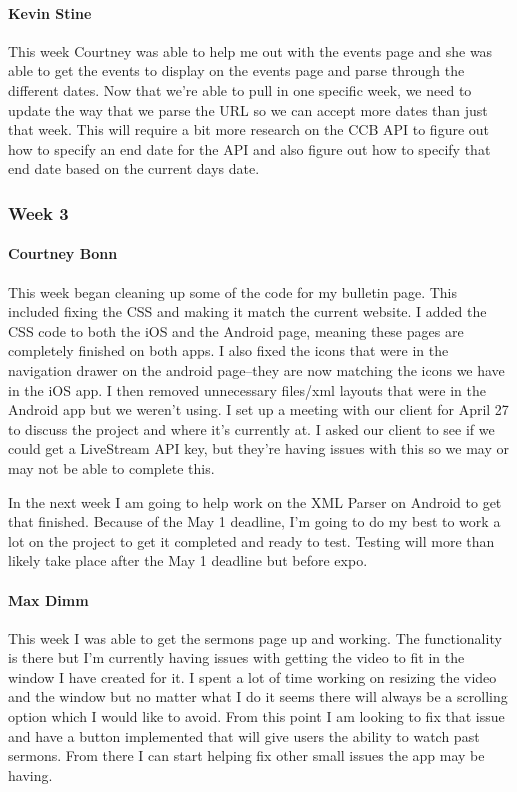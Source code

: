 			\paragraph{Kevin Stine}
			This week Courtney was able to help me out with the events page and she was able to get the events to display on the events page and parse through the different dates. Now that we're able to pull in one specific week, we need to update the way that we parse the URL so we can accept more dates than just that week. This will require a bit more research on the CCB API to figure out how to specify an end date for the API and also figure out how to specify that end date based on the current days date.

		\subsubsection{Week 3}

			\paragraph{Courtney Bonn}
			This week began cleaning up some of the code for my bulletin page. This included fixing the CSS and making it match the current website. I added the CSS code to both the iOS and the Android page, meaning these pages are completely finished on both apps. I also fixed the icons that were in the navigation drawer on the android page--they are now matching the icons we have in the iOS app. I then removed unnecessary files/xml layouts that were in the Android app but we weren't using. I set up a meeting with our client for April 27 to discuss the project and where it's currently at. I asked our client to see if we could get a LiveStream API key, but they're having issues with this so we may or may not be able to complete this.

In the next week I am going to help work on the XML Parser on Android to get that finished. Because of the May 1 deadline, I'm going to do my best to work a lot on the project to get it completed and ready to test. Testing will more than likely take place after the May 1 deadline but before expo.

			\paragraph{Max Dimm}
			This week I was able to get the sermons page up and working. The functionality is there but I'm currently having issues with getting the video to fit in the window I have created for it. I spent a lot of time working on resizing the video and the window but no matter what I do it seems there will always be a scrolling option which I would like to avoid. From this point I am looking to fix that issue and have a button implemented that will give users the ability to watch past sermons. From there I can start helping fix other small issues the app may be having.

